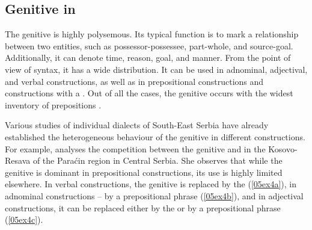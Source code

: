 \documentclass[output=paper,colorlinks,citecolor=brown]{langscibook}
\begin{document}
\subsection{Genitive  in } \label{05sec3.2}

The  genitive is highly polysemous. Its typical function is to mark a relationship between two entities, such as possessor-possessee, part-whole, and source-goal. Additionally, it can denote time, reason, goal, and manner. From the point of view of syntax, it has a wide distribution. It can be used in adnominal, adjectival, and verbal constructions, as well as in prepositional constructions and constructions with a . Out of all the cases, the genitive occurs with the widest inventory of prepositions \citep{felesko1955}.

Various studies of individual dialects of South-East Serbia have already established the heterogeneous behaviour of the genitive in different constructions. For example, \citet{miloradovic2003} analyses the competition between the genitive and  in the Kosovo-Resava  of the Paraćin region in Central Serbia. She observes that while the genitive is dominant in prepositional constructions, its use is highly limited elsewhere. In verbal constructions, the genitive is replaced by the  (\ref{05ex4a}), in adnominal constructions -- by a prepositional phrase (\ref{05ex4b}), and in adjectival constructions, it can be replaced either by the  or by a prepositional phrase (\ref{05ex4c}).
\end{document}
